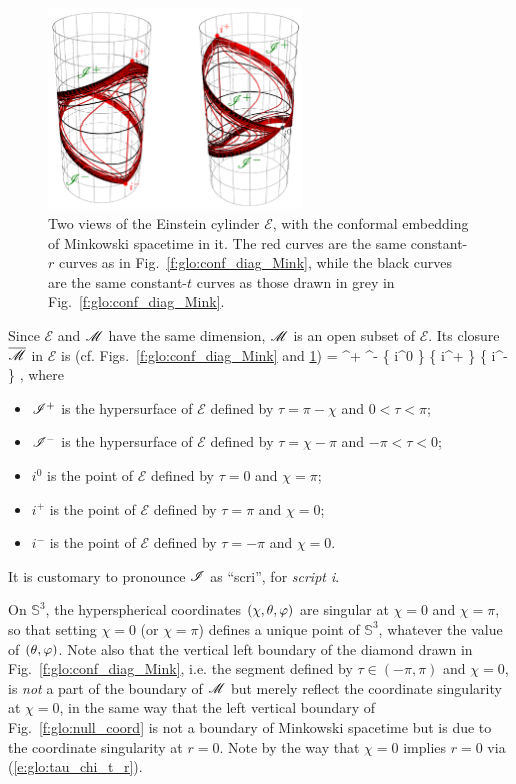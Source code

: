 \begin{figure}
\centerline{\includegraphics[width=0.6\textwidth]{glo_Einstcyl_Mink.pdf}}
\caption[]{\label{f:glo:Einstcyl_Mink}\footnotesize
Two views of the Einstein cylinder $\mathscr{E}$, with the conformal embedding of
Minkowski spacetime in it.
The red curves are the same constant-$r$ curves
as in Fig.~\ref{f:glo:conf_diag_Mink}, while the black curves are
the same constant-$t$ curves as those drawn in grey in Fig.~\ref{f:glo:conf_diag_Mink}.}
\end{figure}

Since $\mathscr{E}$ and $\mathscr{M}$ have the same dimension, $\mathscr{M}$ is an open subset of $\mathscr{E}$.
Its closure $\overline{\mathscr{M}}$ in $\mathscr{E}$ is (cf.
Figs.~\ref{f:glo:conf_diag_Mink} and \ref{f:glo:Einstcyl_Mink})
\be
    \overline{\M} = \M \cup \scri^+ \cup \scri^- \cup \left\{ i^0 \right\} \cup
            \left\{ i^+ \right\} \cup \left\{ i^- \right\} ,
\ee
where
\begin{itemize}
\item $\mathscr{I}^+$ is the hypersurface of $\mathscr{E}$ defined by
$\tau = \pi - \chi$ and $0 < \tau < \pi$;
\item $\mathscr{I}^-$ is the hypersurface of $\mathscr{E}$ defined by
$\tau = \chi - \pi $ and $-\pi  < \tau < 0$;
\item $i^0$ is the point of $\mathscr{E}$ defined by $\tau=0$ and $\chi=\pi$;
\item $i^+$ is the point of $\mathscr{E}$ defined by $\tau=\pi$ and $\chi=0$;
\item $i^-$ is the point of $\mathscr{E}$ defined by $\tau=-\pi$ and $\chi=0$.
\end{itemize}
It is customary to pronounce $\mathscr{I}$ as ``scri'', for \emph{script i}.

\begin{remark}
On $\mathbb{S}^3$, the hyperspherical coordinates $(\chi,\theta,\varphi)$
are singular at $\chi=0$ and $\chi=\pi$, so that setting $\chi=0$ (or $\chi=\pi$)
defines a unique point of $\mathbb{S}^3$, whatever the value of $(\theta,\varphi)$.
Note also that the vertical left boundary of the diamond drawn in
Fig.~\ref{f:glo:conf_diag_Mink}, i.e. the segment defined by
$\tau\in(-\pi,\pi)$ and $\chi=0$, is \emph{not} a part of the boundary
of $\mathscr{M}$ but merely reflect the coordinate singularity at $\chi=0$, in the same
way that the left vertical boundary of Fig.~\ref{f:glo:null_coord}
is not a boundary of Minkowski spacetime but is
due to the coordinate singularity at $r=0$. Note by the way that
$\chi=0$ implies $r=0$ via (\ref{e:glo:tau_chi_t_r}).
\end{remark}

